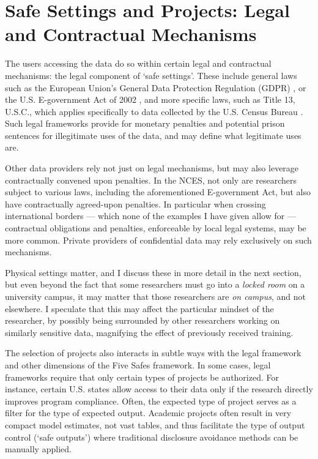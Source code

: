 \section{Safe Settings and Projects: Legal and Contractual Mechanisms}

The users accessing the data do so within certain legal and contractual mechanisms: the legal component of `safe settings'. These include general laws such as the European Union's General Data Protection Regulation (GDPR) \cite{noauthor_general_2016}, or the U.S. E-government Act of 2002 \cite{noauthor_e-government_2002}, and more specific laws, such as Title 13, U.S.C., which applies specifically to data collected by the U.S. Census Bureau \cite{noauthor_title_nodate,us_census_bureau_federal_2021}. Such legal frameworks provide for monetary penalties and potential prison sentences for illegitimate uses of the data, and may define what legitimate uses are. 

Other data providers rely not just on legal mechanisms, but may also leverage contractually convened upon penalties. In the NCES, not only are researchers subject to various laws, including the aforementioned E-government Act, but also have contractually agreed-upon penalties. In particular when crossing international borders --- which none of the examples I have given allow for --- contractual obligations and penalties, enforceable by local legal systems, may be more common. Private providers of confidential data may rely exclusively on such mechanisms. 

Physical settings matter, and I discuss these in more detail in the next section, but even beyond the fact that some researchers must go into a \textit{locked room} on a university campus, it may matter that those researchers are \textit{on campus}, and not elsewhere. I speculate that this  may affect the particular mindset of the researcher, by possibly being surrounded by other researchers working on similarly sensitive data, magnifying the effect of previously received training. 

The selection of projects also interacts in subtle ways with the legal framework and other dimensions of the Five Safes framework. In some cases, legal frameworks require that only certain types of projects be authorized. For instance, certain U.S. states allow access to their data only if the research directly improves program compliance. Often, the expected type of project serves as a filter for the type of expected output. Academic projects often result in very compact model estimates, not vast tables, and thus facilitate the type of output control (`safe outputs') where traditional disclosure avoidance methods can be manually applied. 

